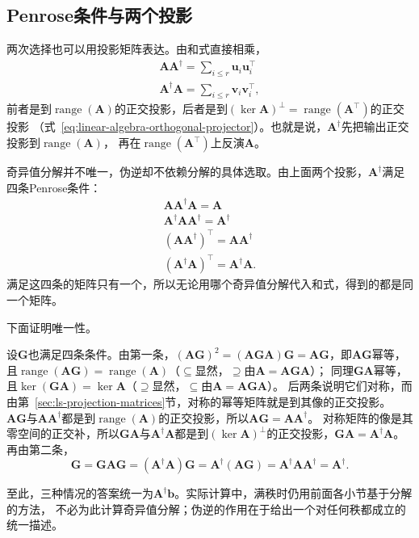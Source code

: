 \subsection{Penrose条件与两个投影}

两次选择也可以用投影矩阵表达。由和式直接相乘，
\[
 \begin{gathered}
\bm A\bm A^\dagger=\sum_{i\leq r}\bm u_i\bm u_i^\top\\
\bm A^\dagger\bm A=\sum_{i\leq r}\bm v_i\bm v_i^\top ,
 \end{gathered}
\]
前者是到$\operatorname{range}(\bm A)$的正交投影，后者是到$(\ker\bm A)^\perp=\operatorname{range}(\bm A^\top)$的正交投影
（式~\eqref{eq:linear-algebra-orthogonal-projector}）。也就是说，$\bm A^\dagger$先把输出正交投影到$\operatorname{range}(\bm A)$，
再在$\operatorname{range}(\bm A^\top)$上反演$\bm A$。

奇异值分解并不唯一，伪逆却不依赖分解的具体选取。由上面两个投影，$\bm A^\dagger$满足四条Penrose条件：
\[
 \begin{gathered}
\bm A\bm A^\dagger\bm A=\bm A\\
\bm A^\dagger\bm A\bm A^\dagger=\bm A^\dagger\\
(\bm A\bm A^\dagger)^\top=\bm A\bm A^\dagger\\
(\bm A^\dagger\bm A)^\top=\bm A^\dagger\bm A .
 \end{gathered}
\]
满足这四条的矩阵只有一个，所以无论用哪个奇异值分解代入和式，得到的都是同一个矩阵。

下面证明唯一性。

设$\bm G$也满足四条条件。由第一条，$(\bm A\bm G)^2=(\bm A\bm G\bm A)\bm G=\bm A\bm G$，即$\bm A\bm G$幂等，
且$\operatorname{range}(\bm A\bm G)=\operatorname{range}(\bm A)$（$\subseteq$显然，$\supseteq$由$\bm A=\bm A\bm G\bm A$）；
同理$\bm G\bm A$幂等，且$\ker(\bm G\bm A)=\ker\bm A$（$\supseteq$显然，$\subseteq$由$\bm A=\bm A\bm G\bm A$）。
后两条说明它们对称，而由第~\ref{sec:ls-projection-matrices}节，对称的幂等矩阵就是到其像的正交投影。
$\bm A\bm G$与$\bm A\bm A^\dagger$都是到$\operatorname{range}(\bm A)$的正交投影，所以$\bm A\bm G=\bm A\bm A^\dagger$。
对称矩阵的像是其零空间的正交补，所以$\bm G\bm A$与$\bm A^\dagger\bm A$都是到$(\ker\bm A)^\perp$的正交投影，$\bm G\bm A=\bm A^\dagger\bm A$。再由第二条，
\[
 \bm G=\bm G\bm A\bm G=(\bm A^\dagger\bm A)\bm G=\bm A^\dagger(\bm A\bm G)=\bm A^\dagger\bm A\bm A^\dagger=\bm A^\dagger .
\]

至此，三种情况的答案统一为$\bm A^\dagger\bm b$。实际计算中，满秩时仍用前面各小节基于分解的方法，
不必为此计算奇异值分解；伪逆的作用在于给出一个对任何秩都成立的统一描述。

